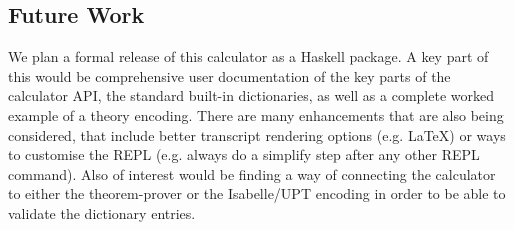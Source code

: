 \subsection{Future Work}\label{ssec:Future}

We plan a formal release of this calculator as a Haskell package.
A key part of this would be comprehensive
user documentation of the key parts of the calculator API,
the standard built-in dictionaries,
as well as a complete worked example of a theory encoding.
There are many enhancements that are also being considered,
that include better transcript rendering options
(e.g. \LaTeX) or ways to customise the REPL
(e.g. always do a simplify step after any other REPL command).
Also of interest would be finding 
a way of connecting the calculator 
to either the  theorem-prover\cite{DBLP:conf/utp/Butterfield10}
or the Isabelle/UPT encoding\cite{DBLP:conf/utp/FosterZW14}
in order to be able to validate the dictionary entries.

